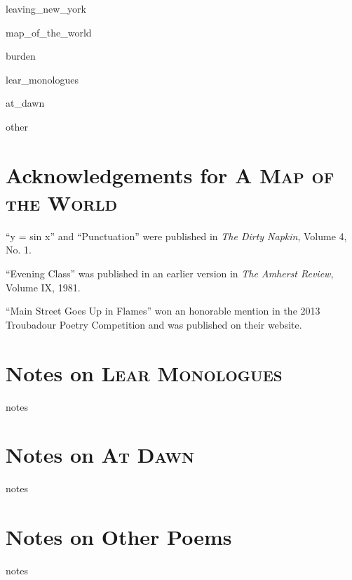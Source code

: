 \documentclass[twoside,openright,final,11pt]{memoir}
\begin{document}
\newcommand*{\starbreak}{\hspace{0.4\versewidth}*\quad*\quad*}

\mainmatter
\pagestyle{myheadings}

{leaving_new_york}

{map_of_the_world}

{burden}

{lear_monologues}


{at_dawn}

{other}

\renewcommand\appendixname{Notes}
\renewcommand\appendixpagename{Notes}
\renewcommand\appendixtocname{Notes}

\backmatter
\appendix
{}


\chapter{Acknowledgements for \textsc{A Map of the World}}

``y = sin x'' and ``Punctuation'' were published in \textit{The Dirty Napkin}, Volume 4, No. 1.

``Evening Class'' was published in an earlier version in \textit{The Amherst Review}, Volume IX, 1981.

``Main Street Goes Up in Flames'' won an honorable mention in the 2013 Troubadour Poetry Competition and was published on their website.

\chapter{Notes on \textsc{Lear Monologues}}
\thispagestyle{myheadings}
{notes}

\chapter{Notes on \textsc{At Dawn}}
\thispagestyle{myheadings}
{notes}

\chapter{Notes on Other Poems}
\thispagestyle{myheadings}
{notes}
\end{document}
